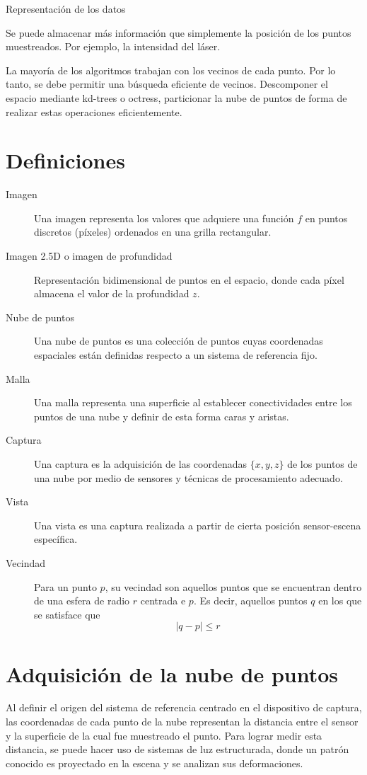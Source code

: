 Representación de los datos

Se puede almacenar más información que simplemente la posición de los puntos muestreados.
Por ejemplo, la intensidad del láser.

La mayoría de los algoritmos trabajan con los vecinos de cada punto.
Por lo tanto, se debe permitir una búsqueda eficiente de vecinos.
Descomponer el espacio mediante kd-trees o octress,
particionar la nube de puntos de forma de realizar estas operaciones eficientemente.

\section{Definiciones}
\begin{description}
	\item [Imagen]
		Una imagen representa los valores que adquiere una función $f$
		en puntos discretos (píxeles) ordenados en una grilla rectangular.
	\item [Imagen 2.5D o imagen de profundidad]
		Representación bidimensional de puntos en el espacio, donde cada píxel
		almacena el valor de la profundidad $z$.
	\item [Nube de puntos]
		Una nube de puntos es una colección de puntos cuyas coordenadas espaciales
		están definidas respecto a un sistema de referencia fijo.
	\item [Malla]
		Una malla representa una superficie al establecer conectividades entre
		los puntos de una nube y definir de esta forma caras y aristas.
	\item [Captura]
		Una captura es la adquisición de las coordenadas $\{x, y, z\}$ de los puntos de una nube
		por medio de sensores y técnicas de procesamiento adecuado.
	\item [Vista]
		Una vista es una captura realizada a partir de cierta posición sensor-escena específica.
	\item [Vecindad]
		Para un punto $p$, su vecindad son aquellos puntos que se encuentran
		dentro de una esfera de radio $r$ centrada e $p$. Es decir, aquellos
		puntos $q$ en los que se satisface que
		\[ |q - p| \leq r \]
\end{description}

\section{Adquisición de la nube de puntos}
Al definir el origen del sistema de referencia centrado en el dispositivo de captura,
las coordenadas de cada punto de la nube representan la distancia entre el sensor y la superficie
de la cual fue muestreado el punto.
Para lograr medir esta distancia, se puede hacer uso de sistemas de luz estructurada,
donde un patrón conocido es proyectado en la escena y se analizan sus deformaciones.

